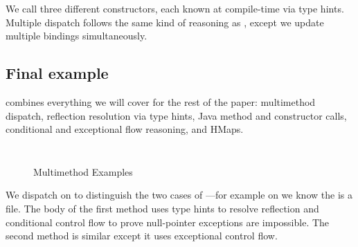 We call three different  constructors, each known at compile-time
via type hints.
Multiple dispatch follows the same kind of reasoning as ,
except we update multiple bindings simultaneously.

\subsection{Final example}

combines everything we will cover for the rest of the paper:
multimethod dispatch, reflection resolution via type hints, Java method
and constructor calls, conditional and exceptional flow reasoning,
and HMaps. 


\begin{figure}
\begin{exmp}
\inputminted[firstline=6,lastline=23]{clojure}{code/demo/src/demo/eg7.clj}
\label{example:multidispatch}
\end{exmp}
\begin{exmp}
\inputminted[firstline=6,lastline=20]{clojure}{code/demo/src/demo/eg8.clj}
\label{example:final}
\end{exmp}
\caption{Multimethod Examples}
\end{figure}

We dispatch on  to distinguish the two cases of ---for example on 
we know the  is a file.
The body of the first method uses type hints to resolve reflection
and conditional control flow to prove null-pointer exceptions are impossible.
The second method is similar except it uses exceptional control flow.

